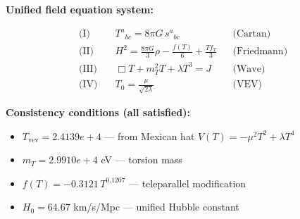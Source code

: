 
\textbf{Unified field equation system:}

\begin{align}
  \text{(I)} \quad & T^a{}_{bc} = 8\pi G \, s^a{}_{bc} && \text{(Cartan)} \\
  \text{(II)} \quad & H^2 = \frac{8\pi G}{3}\rho - \frac{f(T)}{6} + \frac{Tf_T}{3} && \text{(Friedmann)} \\
  \text{(III)} \quad & \Box T + m_T^2 T + \lambda T^3 = J && \text{(Wave)} \\
  \text{(IV)} \quad & T_0 = \frac{\mu}{\sqrt{2\lambda}} && \text{(VEV)}
\end{align}

\textbf{Consistency conditions (all satisfied):}
\begin{itemize}
  \item $T_{\text{vev}} = 2.4139e+4$ — from Mexican hat $V(T) = -\mu^2 T^2 + \lambda T^4$
  \item $m_T = 2.9910e+4$ eV — torsion mass
  \item $f(T) = -0.3121 \, T^{0.1207}$ — teleparallel modification
  \item $H_0 = 64.67$ km/s/Mpc — unified Hubble constant
\end{itemize}